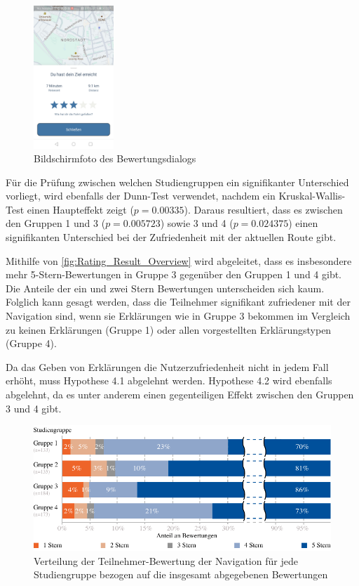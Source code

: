 \begin{figure}[htb!]
    \centering
    \includegraphics[width=0.27\textwidth]{contents/06_model_evaluation/02_evaluation/res/rating_screenshot.jpg}
    \caption{Bildschirmfoto des Bewertungsdialogs}
    \label{fig:screenshot_destination_reached}
\end{figure}


Für die Prüfung zwischen welchen Studiengruppen ein signifikanter Unterschied vorliegt, wird ebenfalls der Dunn-Test \cite{dunn1964multiple} verwendet, nachdem ein Kruskal-Wallis-Test einen Haupteffekt zeigt ($ p = 0.00335 $). Daraus resultiert, dass es zwischen den Gruppen 1 und 3 ($ p = 0.005723$) sowie 3 und 4 ($ p = 0.024375 $) einen signifikanten Unterschied bei der Zufriedenheit mit der aktuellen Route gibt.

Mithilfe von \autoref{fig:Rating_Result_Overview} wird abgeleitet, dass es insbesondere mehr 5-Stern-Bewertungen in Gruppe 3 gegenüber den Gruppen 1 und 4 gibt. Die Anteile der ein und zwei Stern Bewertungen unterscheiden sich kaum. Folglich kann gesagt werden, dass die Teilnehmer signifikant zufriedener mit der Navigation sind, wenn sie Erklärungen wie in Gruppe 3 bekommen im Vergleich zu keinen Erklärungen (Gruppe 1) oder allen vorgestellten Erklärungstypen (Gruppe 4).

Da das Geben von Erklärungen die Nutzerzufriedenheit nicht in jedem Fall erhöht, muss Hypothese 4.1 abgelehnt werden. Hypothese 4.2 wird ebenfalls abgelehnt, da es unter anderem einen gegenteiligen Effekt zwischen den Gruppen 3 und 4 gibt.

\begin{figure}[t!]
    \centering
    \includegraphics[width=\textwidth]{contents/06_model_evaluation/02_evaluation/res/rating_result_overview.pdf}
    \caption{Verteilung der Teilnehmer-Bewertung der Navigation für jede Studiengruppe bezogen auf die insgesamt abgegebenen Bewertungen}
    \label{fig:Rating_Result_Overview}
\end{figure}

